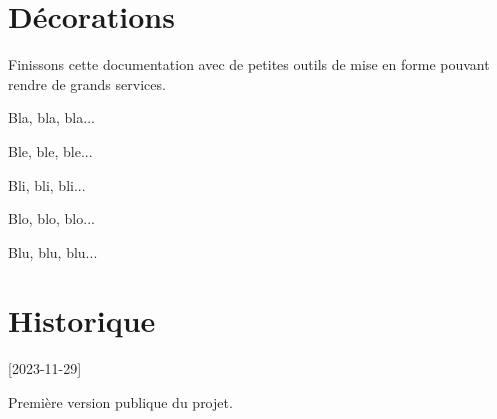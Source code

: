 

\begin{tdocexa}
    \leavevmode

\end{tdocexa}




\begin{tdocexa}
    \leavevmode

\end{tdocexa}


\section{Décorations}

Finissons cette documentation avec de petites outils de mise en forme pouvant rendre de grands services.


\begin{tdoclatex}[sbs]
Bla, bla, bla...

\tdocsep %

Ble, ble, ble...

Bli, bli, bli...

\tdocxspace %

Blo, blo, blo...

Blu, blu, blu...

\end{tdoclatex}
\section{Historique}

[2023-11-29]

Première version publique du projet.


